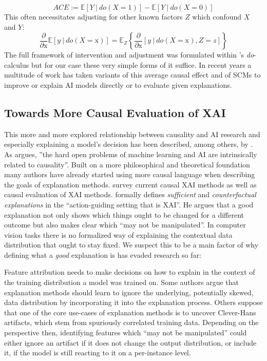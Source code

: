 \begin{equation}
\displaystyle ACE := \mathbb{E} [ Y \ | \ do(X=1) ] - \mathbb{E} [ Y \ | \ do(X=0) ] 
\end{equation}
This often necessitates adjusting for other known factors $Z$ which confound $X$ and $Y$:
\begin{equation}
\frac{\partial}{\partial \mathrm{x}} \mathbb{E} [ y \ | \ do(X=\mathrm{x}) ] = 
\mathbb{E}_Z \left\{ \frac{\partial}{\partial \mathrm{x}} [ y \ | \ do(X=\mathrm{x}), Z=z ] \right\}
\end{equation}
The full framework of intervention and adjustment was formulated within \citet{Pearl2009}'s \textit{do}-calculus  but for our case these very simple forms of it suffice.
In recent years a multitude of work has taken variants of this average causal effect and of SCMs to improve or explain AI models directly or to evaluate given explanations. 

\subsection{Towards More Causal Evaluation of XAI}\label{section:causal_xai}
This more and more explored relationship between causality and AI research and especially explaining a model's decision has been described, among others, by \cite{Moraffah2020a, Beckers2022}.
As \citet{Schoelkopf2019} argues, ''the hard open problems of machine learning and AI are intrinsically related to causality''.
Built on a more philosophical and theoretical foundation \citep{Woodward2004, Halpern2005,Halpern2005a, Schoelkopf2019} many authors have already started using more causal language when describing the goals of explanation methods. \citet{Moraffah2020a} survey current causal XAI methods as well as causal evaluation of XAI methods.
\citet{Beckers2022} formally defines \textit{sufficient} and \textit{counterfactual explanations} in the ``action-guiding setting that is XAI''. He argues that a good explanation not only shows which things ought to be changed for a different outcome but also makes clear which ``may not be manipulated''. In computer vision tasks there is no formalized way of explaining the contextual data distribution that ought to stay fixed. We suspect this to be a main factor of why defining what a \textit{good} explanation is has evaded research so far: 

Feature attribution needs to make decisions on how to explain in the context of the training distribution a model was trained on.
Some authors \citep{Kindermans2017,Wilming2023, Wilming2022} argue that explanation methods should learn to ignore the underlying, potentially skewed, data distribution by incorporating it into the explanation process. Others suppose that one of the core use-cases of explanation methods is to uncover Clever-Hans artifacts, which stem from spuriously correlated training data. Depending on the perspective then, identifying features which ``may not be manipulated'' could either ignore an artifact if it does not change the output distribution, or include it, if the model is still reacting to it on a per-instance level. 

